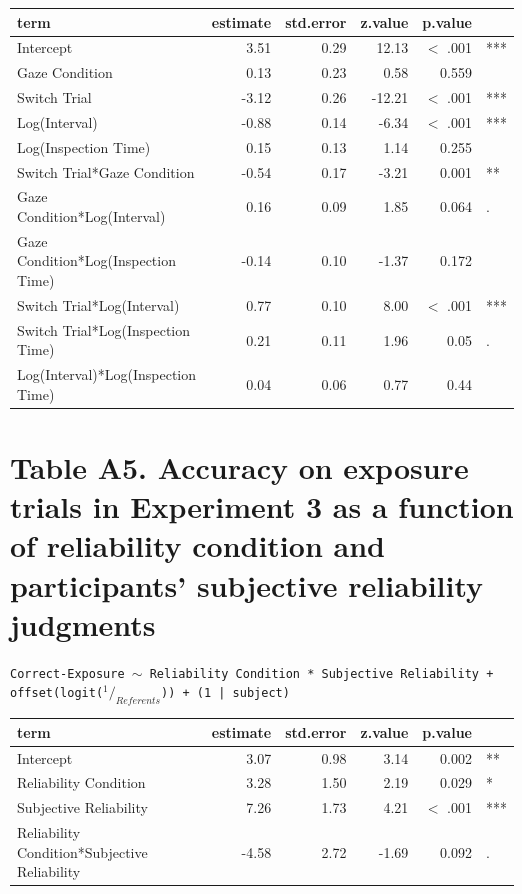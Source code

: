 \documentclass[authoryear, review]{elsarticle}
\begin{document}
\begin{table}[h]
\centering
\begin{tabular}{lrrrrl}
 term & estimate & std.error & z.value & p.value &  \\ 
  \hline
Intercept & 3.51 & 0.29 & 12.13 & $<$ .001 & *** \\ 
  Gaze Condition & 0.13 & 0.23 & 0.58 & 0.559 &  \\ 
  Switch Trial & -3.12 & 0.26 & -12.21 & $<$ .001 & *** \\ 
  Log(Interval) & -0.88 & 0.14 & -6.34 & $<$ .001 & *** \\ 
  Log(Inspection Time) & 0.15 & 0.13 & 1.14 & 0.255 &  \\ 
  Switch Trial*Gaze Condition & -0.54 & 0.17 & -3.21 & 0.001 & ** \\ 
  Gaze Condition*Log(Interval) & 0.16 & 0.09 & 1.85 & 0.064 & . \\ 
  Gaze Condition*Log(Inspection Time) & -0.14 & 0.10 & -1.37 & 0.172 &  \\ 
  Switch Trial*Log(Interval) & 0.77 & 0.10 & 8.00 & $<$ .001 & *** \\ 
  Switch Trial*Log(Inspection Time) & 0.21 & 0.11 & 1.96 & 0.05 & . \\ 
  Log(Interval)*Log(Inspection Time) & 0.04 & 0.06 & 0.77 & 0.44 &  \\ 
   \hline
\end{tabular}
\label{tab:e2_acc_it}
\end{table}

\newpage

\section*{Table A5. Accuracy on exposure trials in Experiment 3 as a function of reliability condition and participants' subjective reliability judgments}

\texttt{Correct-Exposure $\sim$ Reliability Condition * Subjective Reliability + \\  offset(logit($^1/_{Referents}$)) + (1 | subject)}

\begin{table}[h]
\centering
\begin{tabular}{lrrrrl}
 term & estimate & std.error & z.value & p.value &  \\ 
  \hline
Intercept & 3.07 & 0.98 & 3.14 & 0.002 & ** \\ 
  Reliability Condition & 3.28 & 1.50 & 2.19 & 0.029 & * \\ 
  Subjective Reliability & 7.26 & 1.73 & 4.21 & $<$ .001 & *** \\ 
  Reliability Condition*Subjective Reliability & -4.58 & 2.72 & -1.69 & 0.092 & . \\ 
   \hline
\end{tabular}
\label{tab:e3_gf_exp}
\end{table}
\end{document}

